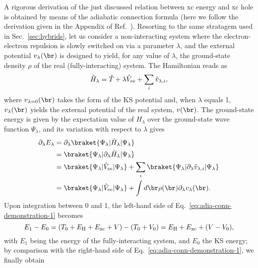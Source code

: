 A rigorous derivation of the just discussed relation between xc energy and xc hole is obtained by means of the adiabatic connection formula (here we follow the derivation given in the Appendix of Ref.~\cite{becke_correlation_1988}). Resorting to the same stratagem used in Sec.~\ref{sec:hybrids}, let us consider a non-interacting system where the electron-electron repulsion is slowly switched on via a parameter $\lambda$, and the external potential $v_{\lambda}(\br)$ is designed to yield, for any value of $\lambda$, the ground-state density $\rho$ of the real (fully-interacting) system. The Hamiltonian reads as
%
\begin{equation}
    \hat{H}_{\lambda} = \hat{T} + \lambda \hat{V}_{\rm ee} + \sum_i \hat{v}_{\lambda,i} ,
    \label{eq:adia-conn-hamiltonian}
\end{equation}
%
where $v_{\lambda=0}(\br)$ takes the form of the KS potential and, when $\lambda$ equals 1, $v_{\lambda}(\br)$ yields the external potential of the real system, $v(\br)$. The ground-state energy is given by the expectation value of $H_{\lambda}$ over the ground-state wave function $\Psi_{\lambda}$, and its variation with respect to $\lambda$ gives
%
\begin{equation}
    \begin{split}
    \partial_{\lambda} E_{\lambda} &= \partial_{\lambda} \braket{\Psi_{\lambda} | \hat{H}_{\lambda} | \Psi_{\lambda}} \\
    &= \braket{\Psi_{\lambda} | \partial_{\lambda} \hat{H}_{\lambda} | \Psi_{\lambda}} \\
    &= \braket{\Psi_{\lambda} | \hat{V}_{\rm ee} | \Psi_{\lambda}} + \sum_i \braket{\Psi_{\lambda} | \partial_{\lambda} \hat{v}_{\lambda,i} | \Psi_{\lambda}} \\
    &= \braket{\Psi_{\lambda} | \hat{V}_{\rm ee} | \Psi_{\lambda}} + \int d\br \rho(\br) \partial_{\lambda} v_{\lambda}(\br) .
    \end{split}
    \label{eq:adia-conn-demonstration-1}
\end{equation}
%
Upon integration between 0 and 1, the left-hand side of Eq.~\eqref{eq:adia-conn-demonstration-1} becomes
%
\begin{equation}
    E_1 - E_0 = (T_0 + E_{\rm H} + E_{\rm xc} + V) - (T_0 + V_0) = E_{\rm H} + E_{\rm xc} + (V - V_0) ,
    \label{eq:adia-conn-demonstration-2}
\end{equation}
%
with $E_1$ being the energy of the fully-interacting system, and $E_0$ the KS energy; by comparison with the right-hand side of Eq.~\eqref{eq:adia-conn-demonstration-1}, we finally obtain
